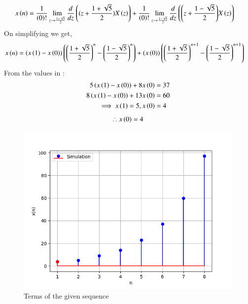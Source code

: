\documentclass[journal,12pt,onecolumn]{IEEEtran}
\begin{document}
	\begin{align}
		x\left(n\right) &=\frac{1}{\left(0\right)!}\lim\limits_{z\to {\frac{1+\sqrt{5}}{2}}}\frac{d}{dz}\left({(z+\frac{1+\sqrt{5}}{2})}X\left(z\right)\right) + \frac{1}{\left(0\right)!}\lim\limits_{z\to \frac{1-\sqrt{5}}{2}}\frac{d}{dz}\left({\left(z+\frac{1-\sqrt{5}}{2}\right)}X\left(z\right)\right)
	\end{align}
	On simplifying we get,
	\begin{align}
		x\left(n\right) &= \left(x\left(1\right)-x\left(0\right)\right)\left(\left(\frac{1+\sqrt{5}}{2}\right)^n-\left(\frac{1-\sqrt{5}}{2}\right)^n\right) + \left(x\left(0\right)\right)\left(\left(\frac{1+\sqrt{5}}{2}\right)^{n+1}-\left(\frac{1-\sqrt{5}}{2}\right)^{n+1}\right)
	\end{align}
	From the values in :
	\begin{align}
		5 \left(x\left(1\right)-x\left(0\right)\right) + 8 x\left(0\right) &=37\\
		8 \left(x\left(1\right)-x\left(0\right)\right) + 13 x\left(0\right) &=60\\
		\implies x\left(1\right) =5, x\left(0\right) &=4
	\end{align}
	\begin{align}
		\therefore {x\ensuremath{\left(0\right)}=4}
	\end{align}
	\begin{figure}[ht]
		\includegraphics[width = \columnwidth]{2023/CS/3/figs/fig4.png}
		\caption{Terms of the given sequence}
		\centering
		\label{fig: fig4}
	\end{figure}
\end{document}
